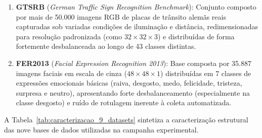 \documentclass[
    12pt,
    openright,
    oneside,
    a4paper,
    english,
    brazil
]{abntex2}
\begin{document}
\begin{enumerate}
    \item \textbf{GTSRB} (\textit{German Traffic Sign Recognition Benchmark}): Conjunto composto por mais de 50.000 imagens RGB de placas de trânsito alemãs reais capturadas sob variadas condições de iluminação e distância, redimensionadas para resolução padronizada (como \(32 \times 32 \times 3\)) e distribuídas de forma fortemente desbalanceada ao longo de 43 classes distintas.
    \item \textbf{FER2013} (\textit{Facial Expression Recognition 2013}): Base composta por 35.887 imagens faciais em escala de cinza (\(48 \times 48 \times 1\)) distribuídas em 7 classes de expressões emocionais básicas (raiva, desgosto, medo, felicidade, tristeza, surpresa e neutro), apresentando forte desbalanceamento (especialmente na classe desgosto) e ruído de rotulagem inerente à coleta automatizada.
\end{enumerate}

A Tabela~\ref{tab:caracterizacao_9_datasets} sintetiza a caracterização estrutural das nove bases de dados utilizadas na campanha experimental.
\end{document}
